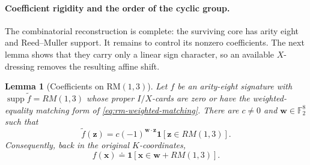 \documentclass[11pt,letterpaper,onecolumn]{article}
\theoremstyle{plain}
\newtheorem{lemma}[lemma]{Lemma}
\theoremstyle{definition}
\theoremstyle{remark}
\newcommand{\Ftwo}{\mathbb F_2}
\newcommand{\supp}{\operatorname{supp}}
\newcommand{\one}{\mathbf 1}
\begin{document}
\paragraph{Coefficient rigidity and the order of the cyclic group.}

The combinatorial reconstruction is complete: the surviving core has arity
eight and Reed--Muller support.  It remains to control its nonzero
coefficients.  The next lemma shows that they carry only a linear sign
character, so an available \(X\)-dressing removes the resulting affine
shift.

\begin{lemma}[Coefficients on \(\mathrm{RM}(1,3)\)]
\label{lem:rm-coefficient-atlas}
Let \(f\) be an arity-eight signature with
\(\supp\widetilde f=RM(1,3)\) whose proper \(I/X\)-cards are zero or have
the weighted-equality matching form of
\cref{eq:rm-weighted-matching}.  There are \(c\ne0\) and
\({\mathbf{w}}\in\Ftwo^8\) such
that
\begin{equation}
  \widetilde f({\mathbf{z}})
  =c(-1)^{{\mathbf{w}}\cdot {\mathbf{z}}}\one[{\mathbf{z}}\in RM(1,3)].
  \label{eq:rm-character-form}
\end{equation}
Consequently, back in the original \(K\)-coordinates,
\begin{equation}
  f({\mathbf{x}})\doteq\one[{\mathbf{x}}\in {\mathbf{w}}+RM(1,3)].
  \label{eq:rm-coset-form}
\end{equation}
\end{lemma}
\end{document}
